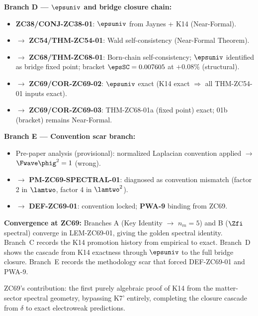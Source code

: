 \documentclass[12pt, a4paper]{article}
\begin{document}
\begin{genealogybox}[title={How ZC69's Key Objects Trace Back}]
\textbf{Branch D --- $\epsuniv$ and bridge closure chain:}
\begin{itemize}[leftmargin=2em, noitemsep]
  \item \textbf{ZC38/CONJ-ZC38-01}: $\epsuniv$ from Jaynes + K14
    (Near-Formal).
  \item $\to$ \textbf{ZC54/THM-ZC54-01}: Wald self-consistency
    (Near-Formal Theorem).
  \item $\to$ \textbf{ZC68/THM-ZC68-01}: Born-chain self-consistency;
    $\epsuniv$ identified as bridge fixed point; bracket $\epsSC=0.007605$
    at $+0.08\%$ (structural).
  \item $\to$ \textbf{ZC69/COR-ZC69-02}: $\epsuniv$ exact
    (K14 exact $\Rightarrow$ all THM-ZC54-01 inputs exact).
  \item $\to$ \textbf{ZC69/COR-ZC69-03}: THM-ZC68-01a (fixed point) exact;
    01b (bracket) remains Near-Formal.
\end{itemize}

\textbf{Branch E --- Convention scar branch:}
\begin{itemize}[leftmargin=2em, noitemsep]
  \item Pre-paper analysis (provisional): normalized Laplacian
    convention applied $\to$ $\Fwave\phig^2 = 1$ (wrong).
  \item $\to$ \textbf{PM-ZC69-SPECTRAL-01}: diagnosed as
    convention mismatch (factor 2 in $\lamtwo$, factor 4 in $\lamtwo^2$).
  \item $\to$ \textbf{DEF-ZC69-01}: convention locked;
    \textbf{PWA-9} binding from ZC69.
\end{itemize}

\textbf{Convergence at ZC69:}
Branches A (Key Identity $\to$ $n_m=5$) and B ($\Zfi$ spectral)
converge in LEM-ZC69-01, giving the golden spectral identity.
Branch~C records the K14 promotion history from empirical to exact.
Branch~D shows the cascade from K14 exactness through
$\epsuniv$ to the full bridge closure.
Branch~E records the methodology scar that forced
DEF-ZC69-01 and PWA-9.

ZC69's contribution: the first purely algebraic proof
of K14 from the matter-sector spectral geometry,
bypassing K7' entirely, completing the closure cascade
from $\delta$ to exact electroweak predictions.
\end{genealogybox}

\end{document}
